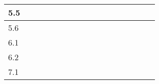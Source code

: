 \begin{table}[H]
{\begin{tabular}{|l|l|l|l|l|l|l|l|l|l|l|l|l|l|l|l|l|}
5.5       &                          &                                                 &                          &                          &                          &                          &                          &                          & \cellcolor[HTML]{000000}{\color[HTML]{000000} } &                                                 &                                                 &                          &                          &                          &                          &                          \\ \hline
5.6       &                          &                                                 &                          &                          &                          &                          &                          &                          & \cellcolor[HTML]{000000}{\color[HTML]{000000} } &                                                 &                                                 &                          &                          &                          &                          &                          \\ \hline
6.1       &                          &                                                 &                          &                          &                          &                          &                          &                          &                                                 & \cellcolor[HTML]{000000}{\color[HTML]{000000} } & \cellcolor[HTML]{000000}{\color[HTML]{000000} } & \cellcolor[HTML]{000000} & \cellcolor[HTML]{000000} &                          &                          &                          \\ \hline
6.2       &                          &                                                 &                          &                          &                          &                          &                          &                          &                                                 & \cellcolor[HTML]{000000}{\color[HTML]{000000} } & \cellcolor[HTML]{000000}{\color[HTML]{000000} } & \cellcolor[HTML]{000000} & \cellcolor[HTML]{000000} &                          &                          &                          \\ \hline
7.1       &                          &                                                 &                          &                          &                          &                          &                          &                          &                                                 &                                                 &                                                 & \cellcolor[HTML]{000000} & \cellcolor[HTML]{000000} & \cellcolor[HTML]{000000} & \cellcolor[HTML]{000000} &                          \\ \hline

\end{tabular}}
\end{table}
